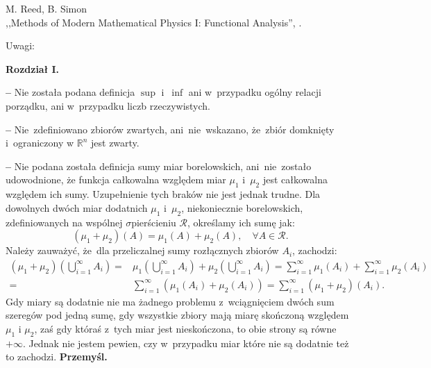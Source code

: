 \documentclass[a4paper,11pt]{article}
\newcommand{\Center}[1]{\begin{center} #1 \end{center}}
\newcommand{\tb}{\textbf}
\newcommand{\noi}{\noindent}
\newcommand{\s}{\sigma}
\newcommand{\Prze}{\textbf{Przemyśl.}}
\newcommand{\Work}[1]{ \begin{center} {\large #1} \end{center} }
\begin{document}
\Work{ M. Reed, B. Simon \\
  ,,Methods of Modern Mathematical Physics I: Functional Analysis'',
  \cite{RS80}. }



\Center{Uwagi:} \noi \tb{Rozdział I.}

\tb{--} Nie została podana definicja $\sup$ i~$\inf$ ani w~przypadku
ogólny relacji porządku, ani w~przypadku liczb rzeczywistych.

\tb{--} Nie~zdefiniowano zbiorów zwartych, ani~nie~wskazano, że~zbiór
domknięty i~ograniczony w $\mathbb{R}^{ n }$ jest zwarty.

\tb{--} Nie podana została definicja sumy miar borelowskich,
ani~nie~zostało udowodnione, że funkcja całkowalna względem miar
$\mu_{ 1 }$ i~$\mu_{ 2 }$ jest całkowalna względem ich
sumy. Uzupełnienie tych braków nie jest jednak trudne.  Dla dowolnych
dwóch miar dodatnich $\mu_{ 1 }$ i~$\mu_{ 2 }$, niekoniecznie
borelowskich, zdefiniowanych na wspólnej $\s$\dywiz pierścieniu
$\mathcal{R}$, określamy ich sumę jak:
\begin{displaymath}
  (\mu_{ 1 } + \mu_{ 2 })( A ) = \mu_{ 1 }( A ) + \mu_{ 2 }( A ), \quad \forall A \in \mathcal{R}.
\end{displaymath}
Należy zauważyć, że~dla przeliczalnej sumy rozłącznych zbiorów
$A_{ i }$, zachodzi:
\begin{displaymath}
  \begin{split}
    ( \mu_{ 1 } + \mu_{ 2 } )\left( \bigcup_{ i = 1 }^{ \infty } A_{ i } \right) =& \mu_{ 1 }\left( \bigcup_{ i = 1 }^{ \infty } A_{ i } \right) + \mu_{ 2 }\left( \bigcup_{ i = 1 }^{ \infty } A_{ i } \right) = \sum_{ i = 1 }^{ \infty } \mu_{ 1 }( A_{ i } ) + \sum_{ i = 1 }^{ \infty } \mu_{ 2 }( A_{ i } )\\
    =& \sum_{ i = 1 }^{ \infty } ( \mu_{ 1 }( A_{ i } ) + \mu_{ 2 }(
    A_{ i } ) ) = \sum_{ i = 1 }^{ \infty } ( \mu_{ 1 } + \mu_{ 2 } )(
    A_{ i } ).
  \end{split}
\end{displaymath}
Gdy miary są dodatnie nie ma żadnego problemu z~wciągnięciem dwóch sum
szeregów pod jedną sumę, gdy wszystkie zbiory mają miarę skończoną
względem $\mu_{ 1 }$ i $\mu_{ 2 }$, zaś gdy któraś z~tych miar jest
nieskończona, to obie strony są równe $+\infty$.  Jednak nie jestem
pewien, czy w~przypadku miar które nie są dodatnie też to
zachodzi. \Prze
\end{document}
